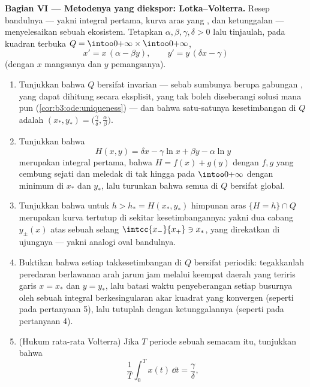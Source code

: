 \begin{problem}
\medskip
\noindent\textbf{Bagian VI --- Metodenya yang diekspor:
Lotka--Volterra.} Resep bandulnya --- yakni integral pertama,
kurva aras yang , dan ketunggalan --- menyelesaikan sebuah ekosistem.
Tetapkan $\alpha, \beta, \gamma, \delta > 0$ lalu tinjaulah, pada
kuadran terbuka $Q = \intoo0{+\infty}\times\intoo0{+\infty}$,
\[
x' = x\,(\alpha - \beta y), \qquad
y' = y\,(\delta x - \gamma)
\]
(dengan $x$ mangsanya dan $y$ pemangsanya).
\begin{enumerate}[resume]
  \item Tunjukkan bahwa $Q$ bersifat invarian --- sebab sumbunya berupa gabungan
        , yang dapat dihitung secara eksplisit, yang tak boleh diseberangi
        solusi mana pun (\cref{cor:b3:ode:uniqueness}) --- dan
        bahwa satu-satunya kesetimbangan di $Q$ adalah $(x_*, y_*) =
        \bigl(\frac\gamma\delta, \frac\alpha\beta\bigr)$.
  \item Tunjukkan bahwa
        \[
        H(x, y) = \delta x - \gamma\ln x + \beta y -
        \alpha\ln y
        \]
        merupakan integral pertama, bahwa $H = f(x) + g(y)$ dengan
        $f, g$ yang cembung sejati dan meledak di tak hingga pada
        $\intoo0{+\infty}$ dengan minimum di $x_*$ dan $y_*$, lalu
        turunkan bahwa semua  di $Q$ bersifat global.
  \item Tunjukkan bahwa untuk $h > h_* = H(x_*, y_*)$ himpunan aras
        $\{H = h\}\cap Q$ merupakan kurva tertutup di sekitar
        kesetimbangannya: yakni dua cabang  $y_\pm(x)$ atas
        sebuah selang  $\intcc{x_-}{x_+} \ni x_*$, yang direkatkan
        di ujungnya --- yakni analogi oval bandulnya.
  \item Buktikan bahwa setiap  takkesetimbangan di $Q$ bersifat
        periodik: tegakkanlah peredaran berlawanan arah jarum jam
        melalui keempat daerah yang teriris garis $x = x_*$
        dan $y = y_*$, lalu batasi waktu penyeberangan setiap busurnya
        oleh sebuah integral berkesingularan akar kuadrat yang
        konvergen (seperti pada pertanyaan 5), lalu tutuplah dengan
        ketunggalannya (seperti pada pertanyaan 4).
  \item (Hukum rata-rata Volterra) Jika $T$ periode
        sebuah  semacam itu, tunjukkan bahwa
        \[
        \frac1T\int_0^Tx(t)\,\dd t = \frac\gamma\delta,
\]
\end{enumerate}
\end{problem}
